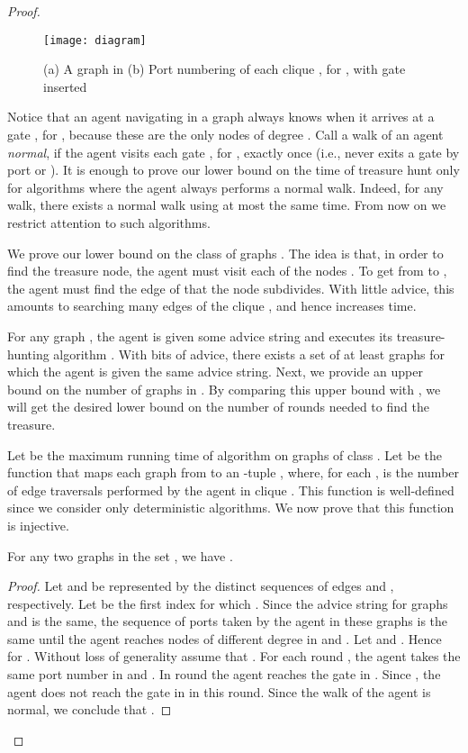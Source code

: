 \documentclass{llncs}
\begin{document}
\begin{proof}
\begin{figure}[!ht]
\begin{center}
\texttt{[image: diagram]}
\end{center}
\caption{(a) A graph in  (b) Port numbering of each clique , for , with gate  inserted }
\label{GraphDiagrams}
\end{figure}


Notice that an agent navigating in a graph   always knows when it arrives at a gate , for , because these are the only nodes of degree
. Call a walk of an agent {\em normal}, if the agent visits each gate , for , exactly once (i.e., never exits a gate by port  or ).
It is enough to prove our lower bound on the time of treasure hunt only for algorithms where the agent always performs a normal walk. Indeed,  for any walk, there exists a normal walk using at most the same time. From now on we restrict attention to such algorithms.


  


We prove our lower bound on the class of graphs . The idea is that, in order to find the treasure node, the agent must visit each of the nodes . To get from  to , the agent must find the edge  of  that the node  subdivides. With little advice, this amounts to searching many edges of the clique , and hence increases time.

For any graph , the agent is given some advice string  and executes its treasure-hunting algorithm . 
With  bits of advice, there exists a set  of at least  graphs for which the agent is given the same advice string. Next, we provide an upper bound on the number of graphs in .  By comparing this upper bound with , we will get the desired lower bound on the number of rounds needed to find the treasure.


Let  be the maximum running time of algorithm  on  graphs of class . 
Let  be the function that maps each graph from  to an -tuple , where, for each ,  is the number of edge traversals performed by the agent in clique . This function is well-defined since we consider only deterministic algorithms. We now prove that this function is injective.

\begin{claim}\label{injective}
For any two graphs  in the set , we have .
\end{claim}
\begin{proof}
Let  and  be represented by the  distinct sequences of edges  and , respectively.
Let  be the first index for which . Since the advice string for graphs  and  is the same, the sequence of ports taken by the agent in these graphs
is the same until the agent reaches nodes of different degree in  and . Let   and  .
Hence  for . Without loss of generality assume that . For each round , the agent  takes the same port number in  and . In round  the agent reaches the gate  in . Since , the agent does not reach the gate   in  in this round. Since the walk of the agent is normal, we conclude that
.  
\end{proof}


\end{proof}
\end{document}
